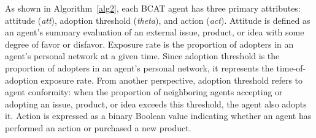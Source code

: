 \documentclass[10pt,letterpaper]{article}
\begin{document}
As shown in Algorithm~\ref{alg2}, each BCAT agent has three primary attributes: attitude (\textit{att}), adoption threshold (\textit{theta}), and action (\textit{act}). Attitude is defined as an agent's summary evaluation of an external issue, product, or idea with some degree of favor or disfavor. Exposure rate is the proportion of adopters in an agent's personal network at a given time. Since adoption threshold is the proportion of adopters in an agent's personal network, it represents the time-of-adoption exposure rate. From another perspective, adoption threshold refers to agent conformity: when the proportion of neighboring agents accepting or adopting an issue, product, or idea exceeds this threshold, the agent also adopts it. Action is expressed as a binary Boolean value indicating whether an agent has performed an action or purchased a new product.
\end{document}
